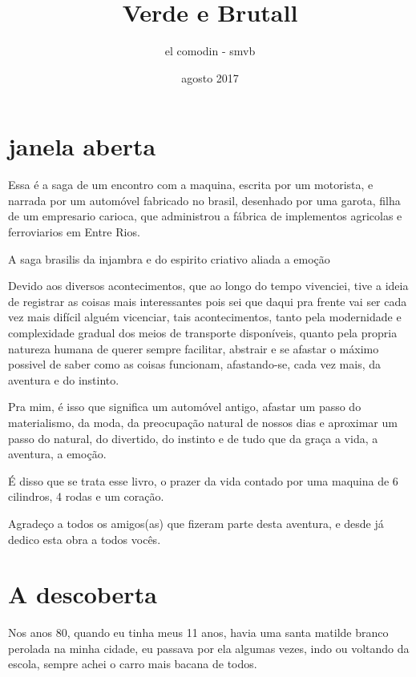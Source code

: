\documentclass[a4paper]{report}
\title{Verde e Brutall}
\author{el comodin - smvb}
\date{ agosto 2017}
\begin{document}
 
\maketitle
 
\tableofcontents

\section*{janela aberta}
Essa \'e a saga de um encontro com a maquina, escrita por um motorista, e narrada por um autom\'ovel 
fabricado no brasil, desenhado por uma garota, filha de um empresario carioca, que administrou a f\'abrica de
 implementos agricolas e ferroviarios em Entre Rios.

A saga brasilis da injambra e do espirito criativo aliada a emo\c{c}\~ao

Devido aos diversos acontecimentos, que ao longo do tempo vivenciei, tive a ideia de 
registrar as coisas mais interessantes pois sei que daqui pra frente vai ser cada vez mais dif\'icil algu\'em vicenciar,
tais acontecimentos, tanto pela modernidade e complexidade gradual dos meios de transporte dispon\'iveis, quanto pela propria
natureza humana de querer sempre facilitar, abstrair e se afastar o m\'aximo possivel de saber como as coisas funcionam,
afastando-se, cada vez mais, da aventura e do instinto.

Pra mim, \'e isso que significa um autom\'ovel antigo, afastar um passo do materialismo, da moda, da preocupa\c{c}\~ao natural de nossos dias
e aproximar um passo do natural, do divertido, do instinto e de tudo que da gra\c{c}a a vida, a aventura, a emo\c{c}\~ao.

\'E disso que se trata esse livro, o prazer da vida contado por uma maquina de 6 cilindros, 4 rodas e um cora\c{c}\~ao.

Agrade\c{c}o a todos os amigos(as) que fizeram parte desta aventura, e desde j\'a dedico esta obra a todos voc\^es.

\section*{A descoberta}
Nos anos 80, quando eu tinha meus 11 anos, havia uma santa matilde branco perolada na minha cidade,
eu passava por ela algumas vezes, indo ou voltando da escola, sempre achei o carro mais bacana de todos.
\end{document}
